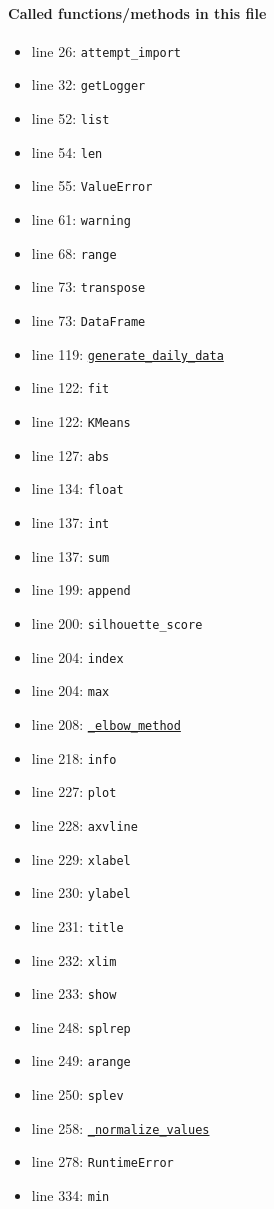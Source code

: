 \documentclass[11pt]{report}
\begin{document}
\paragraph{Called functions/methods in this file}
\begin{itemize}[leftmargin=*]
  \item line 26: \texttt{attempt\_import}
  \item line 32: \texttt{getLogger}
  \item line 52: \texttt{list}
  \item line 54: \texttt{len}
  \item line 55: \texttt{ValueError}
  \item line 61: \texttt{warning}
  \item line 68: \texttt{range}
  \item line 73: \texttt{transpose}
  \item line 73: \texttt{DataFrame}
  \item line 119: \hyperref[def:pricetaker-clustering.py:generate_daily_data:L35]{\texttt{generate\_daily\_data}}
  \item line 122: \texttt{fit}
  \item line 122: \texttt{KMeans}
  \item line 127: \texttt{abs}
  \item line 134: \texttt{float}
  \item line 137: \texttt{int}
  \item line 137: \texttt{sum}
  \item line 199: \texttt{append}
  \item line 200: \texttt{silhouette\_score}
  \item line 204: \texttt{index}
  \item line 204: \texttt{max}
  \item line 208: \hyperref[def:pricetaker-clustering.py:_elbow_method:L238]{\texttt{\_elbow\_method}}
  \item line 218: \texttt{info}
  \item line 227: \texttt{plot}
  \item line 228: \texttt{axvline}
  \item line 229: \texttt{xlabel}
  \item line 230: \texttt{ylabel}
  \item line 231: \texttt{title}
  \item line 232: \texttt{xlim}
  \item line 233: \texttt{show}
  \item line 248: \texttt{splrep}
  \item line 249: \texttt{arange}
  \item line 250: \texttt{splev}
  \item line 258: \hyperref[def:pricetaker-clustering.py:_normalize_values:L332]{\texttt{\_normalize\_values}}
  \item line 278: \texttt{RuntimeError}
  \item line 334: \texttt{min}
\end{itemize}
\end{document}
